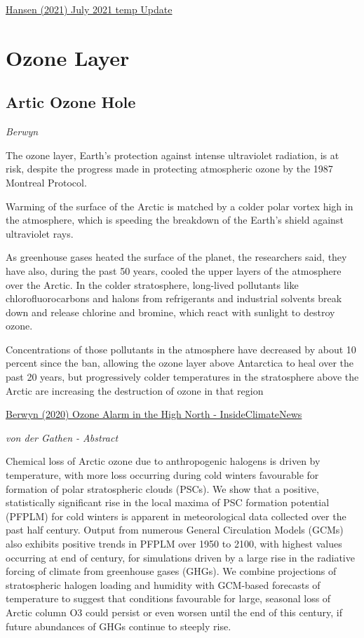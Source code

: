 \documentclass[
]{book}
\begin{document}
\href{https://mailchi.mp/caa/july-temperature-update-faustian-payment-comes-due?e=96d59a909f}{Hansen (2021) July 2021 temp Update}

\hypertarget{ozone-layer}{%
\section{Ozone Layer}\label{ozone-layer}}

\hypertarget{artic-ozone-hole}{%
\subsection{Artic Ozone Hole}\label{artic-ozone-hole}}

\emph{Berwyn}

The ozone layer, Earth's protection against intense ultraviolet radiation, is at risk, despite the progress made in protecting atmospheric ozone by the 1987 Montreal Protocol.

Warming of the surface of the Arctic is matched by a colder polar vortex high in the atmosphere, which is speeding the breakdown of the Earth's shield against ultraviolet rays.

As greenhouse gases heated the surface of the planet, the researchers said, they have also, during the past 50 years, cooled the upper layers of the atmosphere over the Arctic. In the colder stratosphere, long-lived pollutants like chlorofluorocarbons and halons from refrigerants and industrial solvents break down and release chlorine and bromine, which react with sunlight to destroy ozone.

Concentrations of those pollutants in the atmosphere have decreased by about 10 percent since the ban, allowing the ozone layer above Antarctica to heal over the past 20 years, but progressively colder temperatures in the stratosphere above the Arctic are increasing the destruction of ozone in that region

\href{https://insideclimatenews.org/news/23062021/climate-research-mosaic-arctic-ozone/}{Berwyn (2020) Ozone Alarm in the High North - InsideClimateNews}

\emph{von der Gathen - Abstract}

Chemical loss of Arctic ozone due to anthropogenic halogens is driven by temperature, with more loss occurring during cold winters favourable for formation of polar stratospheric clouds (PSCs). We show that a positive, statistically significant rise in the local maxima of PSC formation potential (PFPLM) for cold winters is apparent in meteorological data collected over the past half century. Output from numerous General Circulation Models (GCMs) also exhibits positive trends in PFPLM over 1950 to 2100, with highest values occurring at end of century, for simulations driven by a large rise in the radiative forcing of climate from greenhouse gases (GHGs). We combine projections of stratospheric halogen loading and humidity with GCM-based forecasts of temperature to suggest that conditions favourable for large, seasonal loss of Arctic column O3 could persist or even worsen until the end of this century, if future abundances of GHGs continue to steeply rise.
\end{document}
